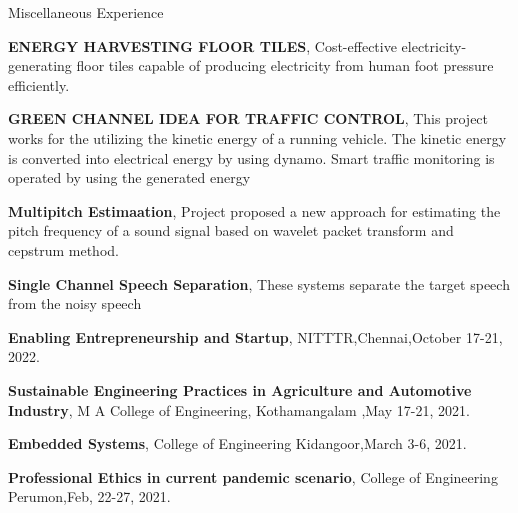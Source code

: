 \begin{rubric}{Miscellaneous Experience}



 
 \textbf{ENERGY HARVESTING FLOOR TILES},  Cost-effective electricity-generating floor tiles capable of producing electricity from human foot pressure efficiently.\par
{} \textbf{GREEN CHANNEL IDEA FOR TRAFFIC CONTROL},  This project works for the utilizing the kinetic energy of a running vehicle. The kinetic energy is converted into electrical energy by using dynamo. Smart traffic monitoring is operated by using the generated energy\par

\entry*[Muhseena T K ] \textbf{Multipitch Estimaation},  Project proposed a new approach for estimating the pitch frequency of a sound signal based on wavelet packet transform and cepstrum method.\par
\entry*[Rakhi E R] \textbf{Single Channel Speech Separation}, These systems separate the target speech from the noisy speech\par
\entry*[2020] \textbf{Enabling Entrepreneurship and Startup},  NITTTR,Chennai,October 17-21, 2022.\par
\entry*[2021] \textbf{Sustainable Engineering Practices in Agriculture and Automotive Industry}, M A College of Engineering, Kothamangalam ,May 17-21, 2021.\par
\entry*[2021] \textbf{Embedded Systems},  College of Engineering Kidangoor,March 3-6, 2021.\par
\entry*[2021] \textbf{Professional Ethics in current pandemic scenario},  College of Engineering Perumon,Feb, 22-27, 2021.\par




\end{rubric}
